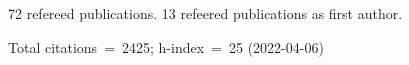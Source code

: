 72 refereed publications. 13 refeered publications as first author.

Total citations~=~2425; h-index~=~25 (2022-04-06)